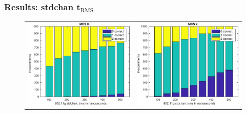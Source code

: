 \documentclass[accentcolor=tud8b,colorbacktitle]{tudbeamer}
\begin{document}
\begin{frame}
\frametitle{Results: stdchan t$_\text{RMS}$}
\begin{figure}[H]
	\centering
	\vspace{-0.5cm}
	\begin{tabular}{cc}
		\includegraphics[height=0.52\textheight]{../../gfx/plots/trms-mcs0} &
		\includegraphics[height=0.52\textheight]{../../gfx/plots/trms-mcs2} \\

\end{tabular}
\end{figure}
\end{frame}
\end{document}
